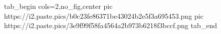  
 
 
 
 

\ifcmt
  tab_begin cols=2,no_fig,center
     pic https://i2.paste.pics/b0c23fe86371be43024b2e5f3a695453.png
		 pic https://i2.paste.pics/3e9f99f58fa4564a2b973b6218f3bccf.png
  tab_end
\fi
